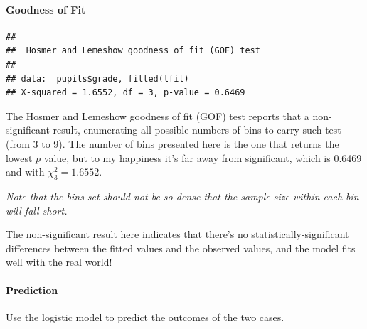 \documentclass[
]{ctexart}
\newenvironment{Shaded}{\begin{snugshade}}{\end{snugshade}}
\newcommand{\AttributeTok}[1]{\textcolor[rgb]{0.13,0.29,0.53}{#1}}
\newcommand{\DecValTok}[1]{\textcolor[rgb]{0.00,0.00,0.81}{#1}}
\newcommand{\FunctionTok}[1]{\textcolor[rgb]{0.13,0.29,0.53}{\textbf{#1}}}
\newcommand{\NormalTok}[1]{#1}
\newcommand{\SpecialCharTok}[1]{\textcolor[rgb]{0.81,0.36,0.00}{\textbf{#1}}}
\begin{document}
\hypertarget{goodness-of-fit-3}{%
\paragraph{Goodness of Fit}\label{goodness-of-fit-3}}

\begin{Shaded}
\end{Shaded}

\begin{verbatim}
## 
##  Hosmer and Lemeshow goodness of fit (GOF) test
## 
## data:  pupils$grade, fitted(lfit)
## X-squared = 1.6552, df = 3, p-value = 0.6469
\end{verbatim}

The Hosmer and Lemeshow goodness of fit (GOF) test reports that a
non-significant result, enumerating all possible numbers of bins to
carry such test (from 3 to 9). The number of bins presented here is the
one that returns the lowest \(p\) value, but to my happiness it's far
away from significant, which is 0.6469 and with \(\chi_3^2=1.6552\).

\emph{Note that the bins set should not be so dense that the sample size
within each bin will fall short.}

The non-significant result here indicates that there's no
statistically-significant differences between the fitted values and the
observed values, and the model fits well with the real world!

\hypertarget{prediction-1}{%
\paragraph{Prediction}\label{prediction-1}}

Use the logistic model to predict the outcomes of the two cases.
\end{document}
